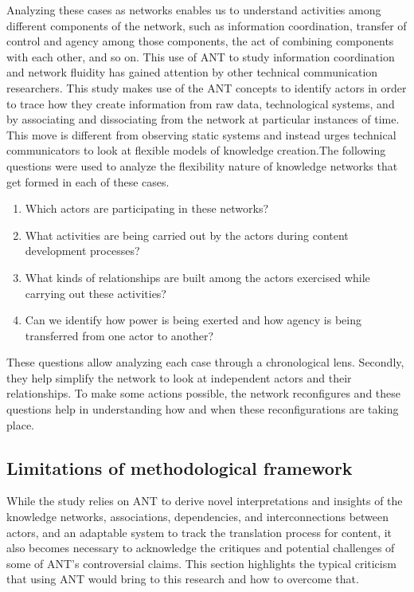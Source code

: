 Analyzing these cases as networks enables us to understand activities among different components of the network, such as information coordination, transfer of control and agency among those components, the act of combining components with each other, and so on. This use of ANT to study information coordination and network fluidity has gained attention by other technical communication researchers. This study makes use of the ANT concepts to identify actors in order to trace how they create information from raw data, technological systems, and by associating and dissociating from the network at particular instances of time. This move is different from observing static systems and instead urges technical communicators to look at flexible models of knowledge creation.The following questions were used to analyze the flexibility nature of knowledge networks that get formed in each of these cases.
\begin{enumerate}
  \item Which actors are participating in these networks?
  \item What activities are being carried out by the actors during content development processes?
  \item What kinds of relationships are built among the actors exercised while carrying out these activities?
  \item Can we identify how power is being exerted and how agency is being transferred from one actor to another?
\end{enumerate}

These questions allow analyzing each case through a chronological lens. Secondly, they help simplify the network to look at independent actors and their relationships. To make some actions possible, the network reconfigures and these questions help in understanding how and when these reconfigurations are taking place.

\subsection{Limitations of methodological framework}
While the study relies on ANT to derive novel interpretations and insights of the knowledge networks, associations, dependencies, and interconnections between actors, and an adaptable system to track the translation process for content, it also becomes necessary to acknowledge the critiques and potential challenges of some of ANT’s controversial claims. This section highlights the typical criticism that using ANT would bring to this research and how to overcome that.

